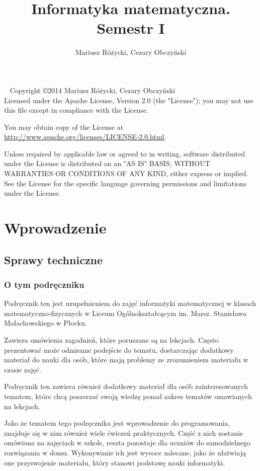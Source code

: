 \documentclass[11pt]{book}
\author{Mariusz Różycki, Cezary Obczyński}
\title{Informatyka matematyczna. Semestr I}
\begin{document}
\frontmatter
\maketitle

\newpage
~\vfill
\thispagestyle{empty}
\noindent Copyright \copyright 2014 Mariusz Różycki, Cezary Obczyński\\

\noindent Licensed under the Apache License, Version 2.0 (the "License");
you may not use this file except in compliance with the License.
\vspace{1em}

\noindent You may obtain copy of the License at 
\url{http://www.apache.org/licenses/LICENSE-2.0.html}.
\vspace{1em}

\noindent Unless required by applicable law or agreed to in writing, software
distributed under the License is distributed on an "AS IS" BASIS,
WITHOUT WARRANTIES OR CONDITIONS OF ANY KIND, either express or implied.
See the License for the specific language governing permissions and
limitations under the License.

\tableofcontents

\mainmatter

\part{Wprowadzenie}
\chapter{Sprawy techniczne}
\section{O tym podręczniku}
Podręcznik ten jest uzupełnieniem do zajęć informatyki matematycznej w klasach
matematyczno-fizycznych w Liceum Ogólnokształcącym im. Marsz. Stanisława
Małachowskiego w Płocku.

Zawiera omówienia zagadnień, które poruszane są na lekcjach. Często
prezentować może odmienne podejście do tematu, dostarczając dodatkowy
materiał do nauki dla osób, które mają problemy ze zrozumieniem materiału
w czasie zajęć.

Podręcznik ten zawiera również dodatkowy materiał dla osób zainteresowanych
tematem, które chcą poszerzać swoją wiedzę ponad zakres tematów omawianych
na lekcjach.

Jako że tematem tego podręcznika jest wprowadzenie do programowania,
znajduje się w nim również wiele ćwiczeń praktycznych. Część z nich zostanie
omówiona na zajęciach w szkole, reszta pozostaje dla uczniów do samodzielnego
rozwiązania w domu. Wykonywanie ich jest wysoce zalecane, jako że ułatwiają
one przyswojenie materiału, który stanowi podstawę nauki informatyki.
\end{document}
